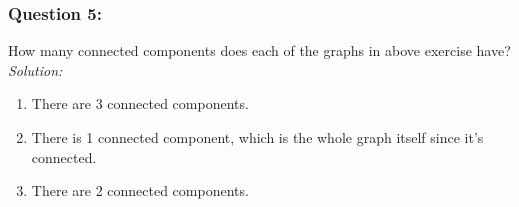 \documentclass[a4paper]{article}
\begin{document}
	
	
	\subsubsection*{Question 5:}
	How many connected components does each of the graphs in above exercise have?\\
	\textit{Solution:}
	\begin{enumerate}[label = \alph*)]
		\item 
		      There are 3 connected components.
		\item 
		      There is 1 connected component, which is the whole graph itself since it's connected.
		\item 
		      There are 2 connected components.
	\end{enumerate}
	
\end{document}
